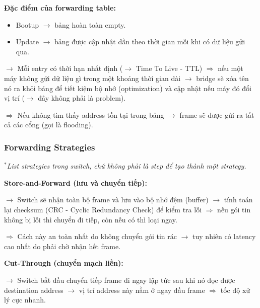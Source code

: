 \pagebreak

\noindent
\textbf{Đặc điểm của forwarding table:}

\begin{itemize}
    \item Bootup $\rightarrow$ bảng hoàn toàn empty.
    \item Update $\rightarrow$ bảng được cập nhật dần theo thời gian mỗi khi có dữ liệu gửi qua.
\end{itemize}
\medskip

\noindent
$\rightarrow$ Mỗi entry có thời hạn nhất định ($\rightarrow$ Time To Live - TTL) $\Rightarrow$ nếu một máy không gửi dữ liệu gì trong một khoảng thời gian dài $\rightarrow$ bridge sẽ xóa tên nó ra khỏi bảng để tiết kiệm bộ nhớ (optimization) và cập nhật nếu máy đó đổi vị trí ($\rightarrow$ đây không phải là problem).
\medskip

$\Rightarrow$ Nếu không tìm thấy address tồn tại trong bảng $\rightarrow$ frame sẽ được gửi ra tất cả các cổng (gọi là flooding).
\medskip

\subsubsection{Forwarding Strategies}

\noindent
\textit{$^*$List strategies trong switch, chứ không phải là step để tạo thành một strategy.}
\medskip

\vspace{0.3cm}

\noindent
\textbf{Store-and-Forward (lưu và chuyển tiếp):}
\medskip

\noindent
$\rightarrow$ Switch sẽ nhận toàn bộ frame và lưu vào bộ nhớ đệm (buffer) $\rightarrow$ tính toán lại checksum (CRC - Cyclic Redundancy Check) để kiểm tra lỗi $\Rightarrow$ nếu gói tin không bị lỗi thì chuyển đi tiếp, còn nếu có thì loại ngay.

$\Rightarrow$ Cách này an toàn nhất do không chuyển gói tin rác $\rightarrow$ tuy nhiên có latency cao nhất do phải chờ nhận hết frame.
\medskip

\vspace{0.3cm}

\noindent
\textbf{Cut-Through (chuyển mạch liền):}
\medskip

\noindent
$\rightarrow$ Switch bắt đầu chuyển tiếp frame đi ngay lập tức sau khi nó đọc được destination address $\rightarrow$ vị trí address này nằm ở ngay đầu frame $\Rightarrow$ tốc độ xử lý cực nhanh.

